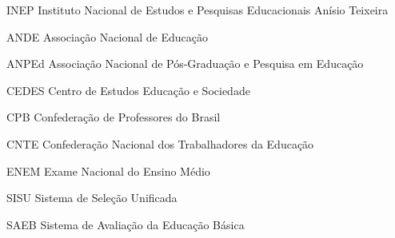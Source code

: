 \documentclass[12pt,openright,twoside,a4paper,chapter=TITLE,english,french,spanish,brazil]{abntex2}
\begin{document}

\listoffigures*
\cleardoublepage
\listoftables*
\cleardoublepage
%
\begin{siglas}   %
\item[INEP]Instituto Nacional de Estudos e Pesquisas Educacionais Anísio Teixeira
\item[ANDE]Associação Nacional de Educação
\item[ANPEd]Associação Nacional de Pós-Graduação e Pesquisa em Educação
\item[CEDES]Centro de Estudos Educação e Sociedade
\item[CPB]Confederação de Professores do Brasil
\item[CNTE]Confederação Nacional dos Trabalhadores da Educação
\item[ENEM]Exame Nacional do Ensino Médio
\item[SISU]Sistema de Seleção Unificada
\item[SAEB]Sistema de Avaliação da Educação Básica
\end{siglas}
\end{document}
